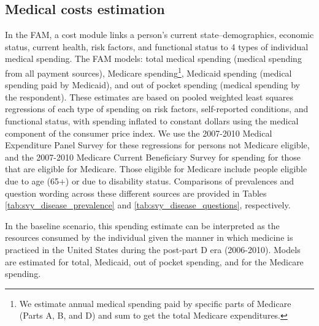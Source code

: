 \subsection{Medical costs estimation}
\label{sec:govt_revenue_and_expenditures_medcost_estimation}
In the FAM, a cost module links a person's current state--demographics, economic status, current health, risk factors, and functional status 
to 4 types of individual medical spending. The FAM models: total medical spending (medical spending from all payment sources), Medicare 
spending\footnote{We estimate annual medical spending paid by specific parts of 
Medicare (Parts A, B, and D) and sum to get the total Medicare expenditures.}, 
Medicaid spending (medical spending paid by Medicaid), and out of pocket spending 
(medical spending by the respondent). These estimates are based on pooled weighted 
least squares regressions of each type of spending on risk factors, self-reported 
conditions, and functional status, with spending inflated to constant dollars 
using the medical component of the consumer price index.  We use the 2007-2010 
Medical Expenditure Panel Survey 
for these regressions for persons 
not Medicare eligible, and the 2007-2010 Medicare Current Beneficiary Survey 
for spending for those that are eligible for Medicare. Those eligible for 
Medicare include people eligible due to age (65+) or due to disability status. Comparisons of prevalences and question wording across these different sources are provided in Tables \ref{tab:svy_disease_prevalence} and \ref{tab:svy_disease_questions}, respectively.

In the baseline scenario, this spending estimate can be interpreted as the resources consumed by the individual given the manner in which 
medicine is practiced in the United States during the post-part D era (2006-2010). 
Models are estimated for total, Medicaid, out of pocket spending, and for the Medicare spending. 

